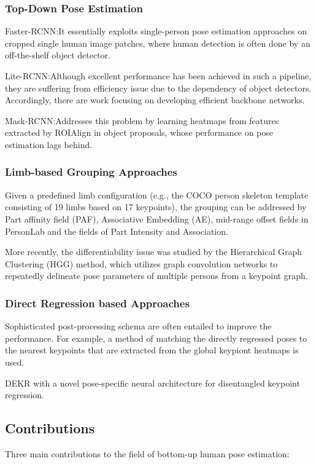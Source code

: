 \documentclass[11pt]{article}
\begin{document}
\subsubsection{Top-Down Pose Estimation}

Faster-RCNN:It essentially exploits single-person pose estimation approaches on cropped single human image patches, where human detection is often done by an off-the-shelf object detector.

Lite-RCNN:Although excellent performance has been achieved in such a pipeline, they are suffering from efficiency issue due to the dependency of object detectors. Accordingly, there are work focusing on developing efficient backbone networks.

Mask-RCNN:Addresses this problem by learning heatmaps from features extracted by ROIAlign in object proposals, whose performance on pose estimation lags behind.

\subsubsection{Limb-based Grouping Approaches}

Given a predefined limb configuration (e.g., the COCO person skeleton template consisting of 19 limbs based on 17 keypoints), the grouping can be addressed
by Part affinity field (PAF), Associative Embedding (AE), mid-range offset fields in PersonLab and the fields of Part Intensity and Association.

More recently, the differentiability issue was studied by the Hierarchical Graph Clustering (HGG) method, which utilizes graph convolution networks to repeatedly delineate pose parameters of multiple persons from a keypoint graph.

\subsubsection{Direct Regression based Approaches}

Sophisticated post-processing schema are often entailed to improve the performance. For example, a method of matching the directly regressed poses to the nearest keypoints that are extracted from the global keypiont heatmaps is used.

DEKR with a novel pose-specific neural architecture for disentangled keypoint regression.
\subsection{Contributions}
Three main contributions to the field of bottom-up human pose estimation:
\end{document}
